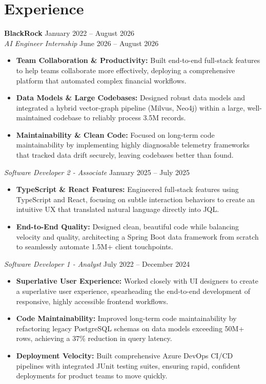 \documentclass[11pt,a4paper]{article}
\begin{document}
\section{Experience}
\noindent
\textbf{BlackRock} \hfill January 2022 -- August 2026 \\
\textit{AI Engineer Internship} \hfill June 2026 -- August 2026
\begin{itemize}[leftmargin=*,noitemsep,topsep=0pt]
    \item \textbf{Team Collaboration \& Productivity:} Built end-to-end full-stack features to help teams collaborate more effectively, deploying a comprehensive platform that automated complex financial workflows.
    \item \textbf{Data Models \& Large Codebases:} Designed robust data models and integrated a hybrid vector-graph pipeline (Milvus, Neo4j) within a large, well-maintained codebase to reliably process 3.5M records.
    \item \textbf{Maintainability \& Clean Code:} Focused on long-term code maintainability by implementing highly diagnosable telemetry frameworks that tracked data drift securely, leaving codebases better than found.
\end{itemize}

\vspace{3pt}
\noindent
\textit{Software Developer 2 - Associate} \hfill January 2025 -- July 2025
\begin{itemize}[leftmargin=*,noitemsep,topsep=0pt]
    \item \textbf{TypeScript \& React Features:} Engineered full-stack features using TypeScript and React, focusing on subtle interaction behaviors to create an intuitive UX that translated natural language directly into JQL.
    \item \textbf{End-to-End Quality:} Designed clean, beautiful code while balancing velocity and quality, architecting a Spring Boot data framework from scratch to seamlessly automate 1.5M+ client touchpoints.
\end{itemize}

\vspace{3pt}
\noindent
\textit{Software Developer 1 - Analyst} \hfill July 2022 -- December 2024
\begin{itemize}[leftmargin=*,noitemsep,topsep=0pt]
    \item \textbf{Superlative User Experience:} Worked closely with UI designers to create a superlative user experience, spearheading the end-to-end development of responsive, highly accessible frontend workflows.
    \item \textbf{Code Maintainability:} Improved long-term code maintainability by refactoring legacy PostgreSQL schemas on data models exceeding 50M+ rows, achieving a 37\% reduction in query latency.
    \item \textbf{Deployment Velocity:} Built comprehensive Azure DevOps CI/CD pipelines with integrated JUnit testing suites, ensuring rapid, confident deployments for product teams to move quickly.
\end{itemize}
\end{document}
